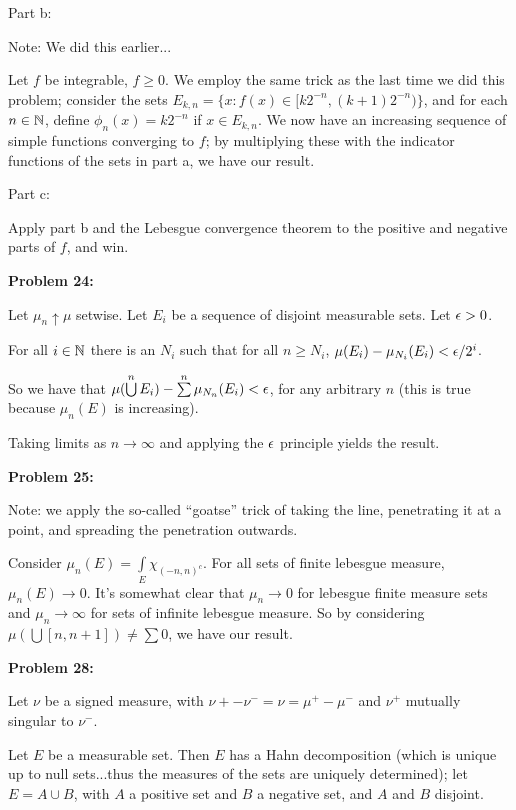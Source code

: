 \documentclass[a4paper,12pt]{article}
\begin{document}
\shunt

Part b:

Note: We did this earlier...

Let $f$ be integrable, $f \geq 0$. We employ the same trick as the last time we did this problem; consider the sets $E_{k,n} = \{x: f(x) \in [k2^{-n},(k+1)2^{-n})\}$, and for each $n \in \mathbb{N}$, define $\phi_n(x)= k2^{-n}$ if $x \in E_{k,n}$. We now have an increasing sequence of simple functions converging to $f$; by multiplying these with the indicator functions of the sets in part a, we have our result.

\shunt

Part c:

Apply part b and the Lebesgue convergence theorem to the positive and negative parts of $f$, and win. %

\shunt

{\bf Problem 24:}

Let $\mu_n \uparrow \mu$ setwise. Let $E_i$ be a sequence of disjoint measurable sets. Let $\epsilon >0$.

For all $i \in \mathbb{N}$ there is an $N_i$ such that for all $n \geq N_i$, $\mu(E_i) -\mu_{N_i}(E_i) < \epsilon/2^i$.

So we have that $\mu(\bigcup\limits^n E_i) - \sum\limits^n\mu_{N_n}(E_i) < \epsilon$, for any arbitrary $n$ (this is true because $\mu_n(E)$ is increasing).

Taking limits as $n \to \infty$ and applying the $\epsilon$ principle yields the result.

\shunt

{\bf Problem 25:}

Note: we apply the so-called ``goatse'' trick of taking the line, penetrating it at a point, and spreading the penetration outwards.

Consider $\mu_n(E) = \int\limits_E \chi_{(-n,n)^c}$. For all sets of finite lebesgue measure, $\mu_n(E) \to 0$. It's somewhat clear that $\mu_n \to 0$ for lebesgue finite measure sets and $\mu_n \to \infty$ for sets of infinite lebesgue measure. So by considering $\mu(\bigcup [n,n+1]) \neq \sum 0$, we have our result.

\shunt

{\bf Problem 28:}

Let $\nu$ be a signed measure, with $\nu+-\nu^- = \nu = \mu^+ - \mu^-$ and $\nu^+$ mutually singular to $\nu^-$.

Let $E$ be a measurable set. Then $E$ has a Hahn decomposition (which is unique up to null sets...thus the measures of the sets are uniquely determined); let $E = A \cup B$, with $A$ a positive set and $B$ a negative set, and $A$ and $B$ disjoint.
\end{document}
